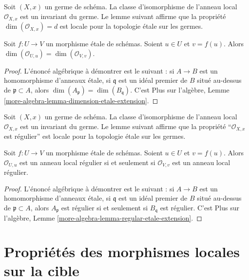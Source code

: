 \noindent
Soit $(X, x)$ un germe de schéma. La classe d'isomorphisme de l'anneau local
$\mathcal{O}_{X, x}$ est un invariant du germe. Le lemme suivant affirme que
la propriété $\dim(\mathcal{O}_{X, x}) = d$ est locale pour la topologie
\'etale sur les germes.

\begin{lemma}
\label{lemma-dimension-local-ring-local}
Soit $f : U \to V$ un morphisme \'etale de schémas. Soient $u \in U$ et
$v = f(u)$. Alors
$\dim(\mathcal{O}_{U, u}) = \dim(\mathcal{O}_{V, v})$.
\end{lemma}

\begin{proof}
L'énoncé algébrique à démontrer est le suivant : si $A \to B$ est un
homomorphisme d'anneaux \'etale, si $\mathfrak q$ est un idéal premier de
$B$ situé au-dessus de $\mathfrak p \subset A$, alors
$\dim(A_{\mathfrak p}) = \dim(B_{\mathfrak q})$. C'est Plus sur l'algèbre,
Lemme \ref{more-algebra-lemma-dimension-etale-extension}.
\end{proof}

\noindent
Soit $(X, x)$ un germe de schéma. La classe d'isomorphisme de l'anneau local
$\mathcal{O}_{X, x}$ est un invariant du germe. Le lemme suivant affirme que
la propriété ``$\mathcal{O}_{X, x}$ est régulier'' est locale pour la
topologie \'etale sur les germes.

\begin{lemma}
\label{lemma-regular-local-ring-local}
Soit $f : U \to V$ un morphisme \'etale de schémas. Soient $u \in U$ et
$v = f(u)$. Alors $\mathcal{O}_{U, u}$ est un anneau local régulier si et
seulement si $\mathcal{O}_{V, v}$ est un anneau local régulier.
\end{lemma}

\begin{proof}
L'énoncé algébrique à démontrer est le suivant : si $A \to B$ est un
homomorphisme d'anneaux \'etale, si $\mathfrak q$ est un idéal premier de
$B$ situé au-dessus de $\mathfrak p \subset A$, alors $A_{\mathfrak p}$ est
régulier si et seulement si $B_{\mathfrak q}$ est régulier. C'est Plus sur
l'algèbre, Lemme \ref{more-algebra-lemma-regular-etale-extension}.
\end{proof}







\section{Propriétés des morphismes locales sur la cible}
\label{section-descending-properties-morphisms}

